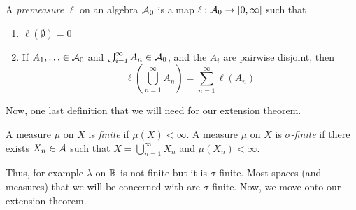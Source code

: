 \begin{definition}
    A \emph{premeasure} $\ell$ on an algebra $\cal{A}_0$ is a map $\ell : \cal{A}_0 \to [0, \infty]$ such that
    \begin{enumerate}
        \item $\ell(\emptyset) = 0$
        \item If $A_1, \ldots \in \cal{A}_0$ and $\bigcup_{i = 1}^{\infty} A_n \in \cal{A}_0$, and the $A_i$ are pairwise disjoint, then
        \[ \ell\left(\bigcup_{n = 1}^{\infty} A_n\right) = \sum_{n = 1}^{\infty} \ell(A_n) \]
    \end{enumerate}
\end{definition}
Now, one last definition that we will need for our extension theorem.

\begin{definition}
    A measure $\mu$ on $X$ is \emph{finite} if $\mu(X) < \infty$. A measure $\mu$ on $X$ is \emph{$\sigma$-finite} if there exists $X_n \in \cal{A}$ such that $X = \bigcup_{n = 1}^{\infty} X_n$ and $\mu(X_n) < \infty$. 
\end{definition}

Thus, for example $\lambda$ on $\R$ is not finite but it is $\sigma$-finite. Most spaces (and measures) that we will be concerned with are $\sigma$-finite. Now, we move onto our extension theorem.

